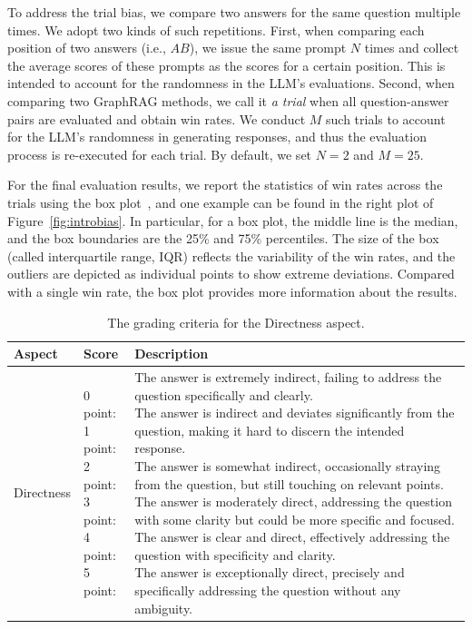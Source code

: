     To address the trial bias, we compare two answers for the same question multiple times. We adopt two kinds of such repetitions. First, when comparing each position of two answers (i.e., $AB$), we issue the same prompt $N$ times and collect the average scores of these prompts as the scores for a certain position. This is intended to account for the randomness in the LLM's evaluations. 
    Second, when comparing two GraphRAG methods, we call it \textit{a trial} when all question-answer pairs are evaluated and obtain win rates. We conduct $M$ such trials to account for the LLM's randomness in generating responses, and thus the evaluation process is re-executed for each trial. By default, we set $N=2$ and $M=25$.
    
      
    For the final evaluation results, we report the statistics of win rates across the trials using the box plot~\cite{williamson1989box}, and one example can be found in the right plot of Figure~\ref{fig:introbias}. In particular, for a box plot, the middle line is the median, and the box boundaries are the 25\% and 75\% percentiles. The size of the box (called interquartile range, IQR) reflects the variability of the win rates, and the outliers are depicted as individual points to show extreme deviations. Compared with a single win rate, the box plot provides more information about the results.
\squishend


        {
\renewcommand{\arraystretch}{2}
\begin{table}
  \caption{The grading criteria for the Directness aspect.}
  \vspace{-0.5em}
  \label{tab:show-score}
  \begin{tabular}{lll}
    \toprule
    Aspect & Score & Description \\
    \midrule
    Directness & \makecell[l]{
    0 point: \\
    1 point:\\
    2 point:\\
    3 point:\\
    4 point:\\
    5 point:\\} 
    & \makecell[l]{
    The answer is extremely indirect, failing to address the question specifically and clearly.\\
    The answer is indirect and deviates significantly from the question, making it hard to discern the intended response.\\
    The answer is somewhat indirect, occasionally straying from the question, but still touching on relevant points.\\
    The answer is moderately direct, addressing the question with some clarity but could be more specific and focused.\\
    The answer is clear and direct, effectively addressing the question with specificity and clarity.\\
    The answer is exceptionally direct, precisely and specifically addressing the question without any ambiguity.\\}\\
    \bottomrule
  \end{tabular}
\end{table}
}

